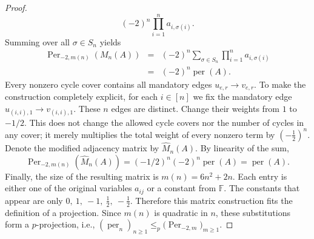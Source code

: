 \documentclass[10pt,a4paper]{amsart}
\begin{document}
\begin{proof}
\[
  (-2)^n\prod_{i=1}^n a_{i,\sigma(i)}.
\]
Summing over all $\sigma\in S_n$ yields
\begin{eqnarray*}
  \operatorname{Per}_{-2,m(n)}(M_n(A))
  &=&(-2)^n\sum_{\sigma\in S_n}\prod_{i=1}^n a_{i,\sigma(i)}\\
  &=&(-2)^n\operatorname{per}(A).
\end{eqnarray*}
Every nonzero cycle cover contains all mandatory edges $u_{e,r}\to v_{e,r}$. To make the construction completely explicit, for each $i\in[n]$ we fix the mandatory edge $u_{(i,i),1}\longrightarrow v_{(i,i),1}$. These $n$ edges are distinct. Change their weights from $1$ to $-1/2$. This does not change the allowed cycle covers nor the number of cycles in any cover; it merely multiplies the total weight of every nonzero term by $\left(-\frac12\right)^n$.
Denote the modified adjacency matrix by $\widehat M_n(A)$. By linearity of the sum,
\[
  \operatorname{Per}_{-2,m(n)}(\widehat M_n(A))
  =
  (-1/2)^n(-2)^n\operatorname{per}(A)
  =
  \operatorname{per}(A).
\]
Finally, the size of the resulting matrix is $m(n)=6n^2+2n$. Each entry is either one of the original variables $a_{ij}$ or a constant from $\mathbb{F}$. The constants that appear are only
$0,\ 1,\ -1,\ \frac12,\ -\frac12$. Therefore this matrix construction fits the definition of a projection. Since $m(n)$ is quadratic in $n$, these substitutions form a $p$-projection, i.e.,
$(\operatorname{per}_n)_{n\geq1}\leq_p\bigl(\operatorname{Per}_{-2,m}\bigr)_{m\geq1}$.
\end{proof}
\end{document}
